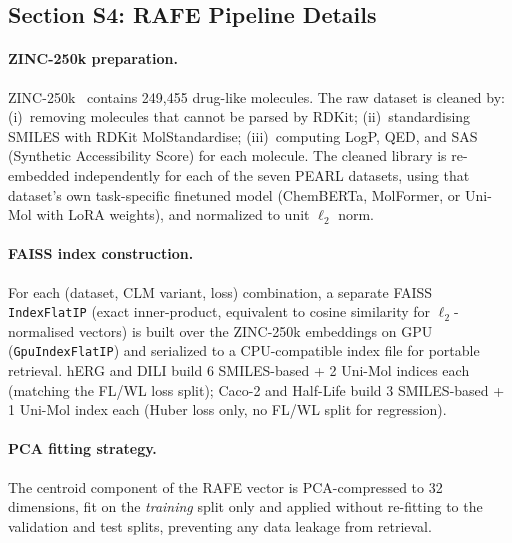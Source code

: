 \documentclass[9pt,a4paper]{article}
\begin{document}
\subsection*{Section S4: RAFE Pipeline Details}

\paragraph{ZINC-250k preparation.}
ZINC-250k~\cite{gomez2018automatic} contains 249{,}455 drug-like molecules.
The raw dataset is cleaned by: (i)~removing molecules that cannot be parsed by
RDKit; (ii)~standardising SMILES with RDKit MolStandardise; (iii)~computing
LogP, QED, and SAS (Synthetic Accessibility Score) for each molecule.
The cleaned library is re-embedded independently for each of the seven PEARL
datasets, using that dataset's own task-specific finetuned model (ChemBERTa,
MolFormer, or Uni-Mol with LoRA weights), and normalized to unit $\ell_2$ norm.

\paragraph{FAISS index construction.}
For each (dataset, CLM variant, loss) combination, a separate FAISS
\texttt{IndexFlatIP} (exact inner-product, equivalent to cosine similarity for
$\ell_2$-normalised vectors) is built over the ZINC-250k embeddings on GPU
(\texttt{GpuIndexFlatIP}) and serialized to a CPU-compatible index file for
portable retrieval. hERG and DILI build 6 SMILES-based + 2 Uni-Mol indices each
(matching the FL/WL loss split); Caco-2 and Half-Life build 3 SMILES-based + 1
Uni-Mol index each (Huber loss only, no FL/WL split for regression).

\paragraph{PCA fitting strategy.}
The centroid component of the RAFE vector is PCA-compressed to 32 dimensions,
fit on the \emph{training} split only and applied without re-fitting to the
validation and test splits, preventing any data leakage from retrieval.
\end{document}

